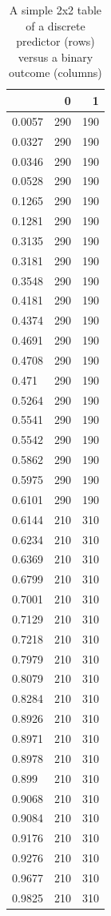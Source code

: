 \documentclass[article]{jss}
\begin{document}
\begin{CodeChunk}
\begin{table}[ht]

\caption{\label{tab:extreme_contin_tab}A simple 2x2 table of a discrete predictor (rows) versus a binary outcome (columns)}
\centering
\begin{tabular}{l|r|r}
\hline
  & 0 & 1\\
\hline
0.0057 & 290 & 190\\
\hline
0.0327 & 290 & 190\\
\hline
0.0346 & 290 & 190\\
\hline
0.0528 & 290 & 190\\
\hline
0.1265 & 290 & 190\\
\hline
0.1281 & 290 & 190\\
\hline
0.3135 & 290 & 190\\
\hline
0.3181 & 290 & 190\\
\hline
0.3548 & 290 & 190\\
\hline
0.4181 & 290 & 190\\
\hline
0.4374 & 290 & 190\\
\hline
0.4691 & 290 & 190\\
\hline
0.4708 & 290 & 190\\
\hline
0.471 & 290 & 190\\
\hline
0.5264 & 290 & 190\\
\hline
0.5541 & 290 & 190\\
\hline
0.5542 & 290 & 190\\
\hline
0.5862 & 290 & 190\\
\hline
0.5975 & 290 & 190\\
\hline
0.6101 & 290 & 190\\
\hline
0.6144 & 210 & 310\\
\hline
0.6234 & 210 & 310\\
\hline
0.6369 & 210 & 310\\
\hline
0.6799 & 210 & 310\\
\hline
0.7001 & 210 & 310\\
\hline
0.7129 & 210 & 310\\
\hline
0.7218 & 210 & 310\\
\hline
0.7979 & 210 & 310\\
\hline
0.8079 & 210 & 310\\
\hline
0.8284 & 210 & 310\\
\hline
0.8926 & 210 & 310\\
\hline
0.8971 & 210 & 310\\
\hline
0.8978 & 210 & 310\\
\hline
0.899 & 210 & 310\\
\hline
0.9068 & 210 & 310\\
\hline
0.9084 & 210 & 310\\
\hline
0.9176 & 210 & 310\\
\hline
0.9276 & 210 & 310\\
\hline
0.9677 & 210 & 310\\
\hline
0.9825 & 210 & 310\\
\hline
\end{tabular}
\end{table}

\end{CodeChunk}
\end{document}
